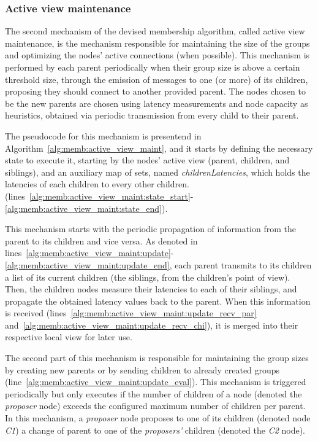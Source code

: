 \subsubsection{Active view maintenance} \label{sec:overlay_network:active_view_maint}

The second mechanism of the devised membership algorithm, called active view maintenance, is the mechanism responsible for maintaining the size of the groups and optimizing the nodes' active connections (when possible). This mechanism is performed by each parent periodically when their group size is above a certain threshold size, through the emission of messages to one (or more) of its children, proposing they should connect to another provided parent. The nodes chosen to be the new parents are chosen using latency measurements and node capacity as heuristics, obtained via periodic transmission from every child to their parent. 

The pseudocode for this mechanism is presentend in Algorithm~\ref{alg:memb:active_view_maint}, and it starts by defining the necessary state to execute it, starting by the nodes' active view (parent, children, and siblings), and an auxiliary map of sets, named \textit{childrenLatencies}, which holds the latencies of each children to every other children. (lines~\ref{alg:memb:active_view_maint:state_start}-\ref{alg:memb:active_view_maint:state_end}). 



This mechanism starts with the periodic propagation of information from the parent to its children and vice versa. As denoted in lines~\ref{alg:memb:active_view_maint:update}-\ref{alg:memb:active_view_maint:update_end}, each parent transmits to its children a list of its current children (the siblings, from the children's point of view). Then, the children nodes measure their latencies to each of their siblings, and propagate the obtained latency values back to the parent. When this information is received (lines~\ref{alg:memb:active_view_maint:update_recv_par} and~\ref{alg:memb:active_view_maint:update_recv_chi}), it is merged into their respective local view for later use.

The second part of this mechanism is responsible for maintaining the group sizes by creating new parents or by sending children to already created groups (line~\ref{alg:memb:active_view_maint:update_eval}). This mechanism is triggered periodically but only executes if the number of children of a  node (denoted the \textit{proposer} node) exceeds the configured maximum number of children per parent. In this mechanism, a \textit{proposer} node proposes to one of its children (denoted node \textit{C1}) a change of parent to one of the \textit{proposers'} children (denoted the \textit{C2} node).


